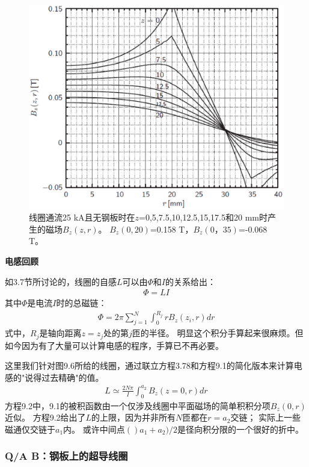 \begin{figure}
	\centering
	\includegraphics[scale=0.5]{chpt9/figs/fig9.7.eps}
	\caption{线圈通流25 kA且无钢板时在$z$=0,5,7.5,10,12.5,15,17.5和20 mm时产生的磁场$B_z(z,r)$。
		$B_z(0,20)$=0.158 T，$B_z(0，35)$=-0.068 T。}
\end{figure}

\textbf{电感回顾}

如3.7节所讨论的，线圈的自感$L$可以由$\Phi$和$I$的关系给出：
\begin{align*}%
\Phi=LI \tag{3.78}
\end{align*}
其中$\Phi$是电流$I$时的总磁链：
\begin{align*}%
\Phi=2\pi\sum_{j=1}^{N}\int_{0}^{R_j}rB_z(z_i,r)dr \tag{9.1}
\end{align*}
式中，$R_j$是轴向距离$z=z_j$处的第$j$匝的半径。
明显这个积分手算起来很麻烦。但如今因为有了大量可以计算电感的程序，手算已不再必要。

这里我们针对图9.6所给的线圈，通过联立方程3.78和方程9.1的简化版本来计算电感的"说得过去精确"的值。
\begin{align*}%
L\simeq\frac{2N\pi}{I}\int_{0}^{a_2}B_z(z=0,r)dr \tag{9.2}
\end{align*}
方程9.2中，9.1的被积函数由一个仅涉及线圈中平面磁场的简单积积分项$B_z(0,r)$近似。
方程9.2给出了$L$的上限，因为并非所有$N$匝都在$r=a_2$交链；
实际上一些磁通仅交链于$a_1$内。
或许中间点$()a_1+a_2)/2$是径向积分限的一个很好的折中。


\subsubsection{Q/A B：钢板上的超导线圈}


